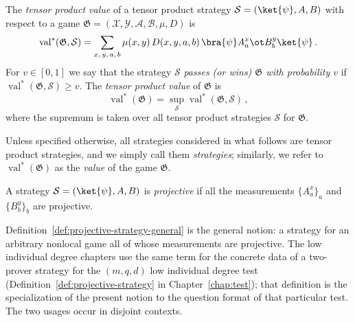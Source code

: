 \begin{definition}\label{def:tensor-product-value}
	\leanok
	The \emph{tensor product value} of a tensor product strategy $\mathcal S = (\ket{\psi}, A, B)$ with respect to a game $\mathfrak G = (\mathcal X, \mathcal Y, \mathcal A, \mathcal B, \mu, D)$ is
	\[
		\operatorname{val}^*(\mathfrak G, \mathcal S) = \sum_{x,\,y,\,a,\,b} \mu(x,y)\, D(x,y,a,b)\, \bra{\psi} A^x_a \ot B^y_b \ket{\psi}\,.
	\]
	For $v \in [0,1]$ we say that the strategy $\mathcal S$ \emph{passes (or wins) $\mathfrak G$ with probability $v$} if $\operatorname{val}^*(\mathfrak G, \mathcal S) \ge v$. The \emph{tensor product value} of $\mathfrak G$ is
	\[
		\operatorname{val}^*(\mathfrak G) = \sup_{\mathcal S} \operatorname{val}^*(\mathfrak G, \mathcal S)\,,
	\]
	where the supremum is taken over all tensor product strategies $\mathcal S$ for $\mathfrak G$.
\end{definition}

Unless specified otherwise, all strategies considered in what follows are tensor product strategies, and we simply call them \emph{strategies}; similarly, we refer to $\operatorname{val}^*(\mathfrak G)$ as the \emph{value} of the game $\mathfrak G$.

\begin{definition}\label{def:projective-strategy-general}
	\leanok
	A strategy $\mathcal S = (\ket{\psi}, A, B)$ is \emph{projective} if all the measurements $\{A^x_a\}_a$ and $\{B^y_b\}_b$ are projective.
\end{definition}

\begin{remark}\label{rem:projective-strategy-relation}
	Definition~\ref{def:projective-strategy-general} is the general notion: a strategy for an arbitrary nonlocal game all of whose measurements are projective. The low individual degree chapters use the same term for the concrete data of a two-prover strategy for the $(m,q,d)$ low individual degree test (Definition~\ref{def:projective-strategy} in Chapter~\ref{chap:test}); that definition is the specialization of the present notion to the question format of that particular test. The two usages occur in disjoint contexts.
\end{remark}

